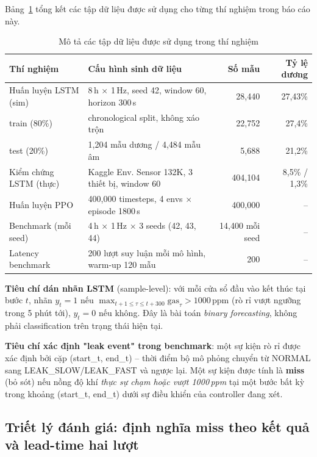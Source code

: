 Bảng~\ref{tab:dataset} tổng kết các tập dữ liệu được sử dụng cho từng thí nghiệm trong báo cáo này.

\begin{table}[H]
\centering
\caption{Mô tả các tập dữ liệu được sử dụng trong thí nghiệm}
\label{tab:dataset}
\begin{tabular}{lp{4.5cm}rr}
\toprule
\textbf{Thí nghiệm} & \textbf{Cấu hình sinh dữ liệu} & \textbf{Số mẫu} & \textbf{Tỷ lệ dương} \\
\midrule
Huấn luyện LSTM (sim) & 8\,h $\times$ 1\,Hz, seed 42, window 60, horizon 300\,s & 28{,}440 & 27{,}43\% \\
\quad train (80\%) & chronological split, không xáo trộn               & 22{,}752 & 27{,}4\%  \\
\quad test (20\%)  & 1{,}204 mẫu dương / 4{,}484 mẫu âm                & 5{,}688  & 21{,}2\%  \\
\addlinespace
Kiểm chứng LSTM (thực) & Kaggle Env. Sensor 132K, 3 thiết bị, window 60 & 404{,}104 & 8{,}5\% / 1{,}3\% \\
Huấn luyện PPO     & 400{,}000 timesteps, 4 envs $\times$ episode 1800\,s & 400{,}000 & -- \\
Benchmark (mỗi seed) & 4\,h $\times$ 1\,Hz $\times$ 3 seeds (42, 43, 44)   & 14{,}400 mỗi seed & -- \\
Latency benchmark  & 200 lượt suy luận mỗi mô hình, warm-up 120 mẫu     & 200 & -- \\
\bottomrule
\end{tabular}
\end{table}

\textbf{Tiêu chí dán nhãn LSTM} (sample-level): với mỗi cửa sổ đầu vào kết thúc tại bước $t$, nhãn $y_t = 1$ nếu $\max_{t+1 \leq \tau \leq t+300} \text{gas}_\tau > 1000\,\text{ppm}$ (rò rỉ vượt ngưỡng trong 5 phút tới), $y_t = 0$ nếu không. Đây là bài toán \emph{binary forecasting}, không phải classification trên trạng thái hiện tại.

\textbf{Tiêu chí xác định "leak event" trong benchmark}: một sự kiện rò rỉ được xác định bởi cặp (start\_t, end\_t) -- thời điểm bộ mô phỏng chuyển từ NORMAL sang LEAK\_SLOW/LEAK\_FAST và ngược lại. Một sự kiện được tính là \textbf{miss} (bỏ sót) nếu nồng độ khí \emph{thực sự chạm hoặc vượt 1000\,ppm} tại một bước bất kỳ trong khoảng (start\_t, end\_t) dưới sự điều khiển của controller đang xét.

\subsection{Triết lý đánh giá: định nghĩa miss theo kết quả và lead-time hai lượt}
\label{ssec:eval_philosophy}

